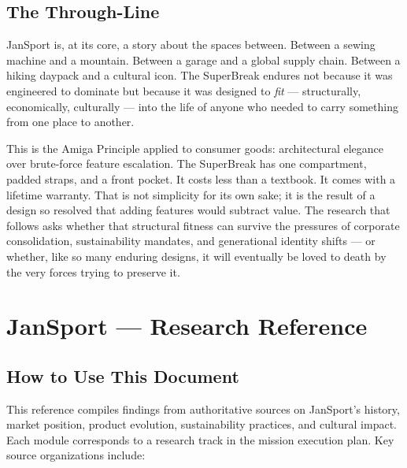 \documentclass[11pt,letterpaper]{article}
\newcommand{\stageheader}[2]{%
  \noindent\colorbox{#2}{\makebox[\textwidth][l]{%
    \textcolor{white}{\bfseries\sffamily\hspace{6pt}#1\hspace{6pt}}}}%
  \vspace{0.5em}\par%
}
\begin{document}
\subsection{The Through-Line}

JanSport is, at its core, a story about the spaces between. Between a sewing machine and a mountain. Between a garage and a global supply chain. Between a hiking daypack and a cultural icon. The SuperBreak endures not because it was engineered to dominate but because it was designed to \textit{fit} --- structurally, economically, culturally --- into the life of anyone who needed to carry something from one place to another.

This is the Amiga Principle applied to consumer goods: architectural elegance over brute-force feature escalation. The SuperBreak has one compartment, padded straps, and a front pocket. It costs less than a textbook. It comes with a lifetime warranty. That is not simplicity for its own sake; it is the result of a design so resolved that adding features would subtract value. The research that follows asks whether that structural fitness can survive the pressures of corporate consolidation, sustainability mandates, and generational identity shifts --- or whether, like so many enduring designs, it will eventually be loved to death by the very forces trying to preserve it.

\newpage

\stageheader{STAGE 2 --- RESEARCH REFERENCE}{secondary}

\section{JanSport --- Research Reference}

\subsection{How to Use This Document}

This reference compiles findings from authoritative sources on JanSport's history, market position, product evolution, sustainability practices, and cultural impact. Each module corresponds to a research track in the mission execution plan. Key source organizations include:
\end{document}
